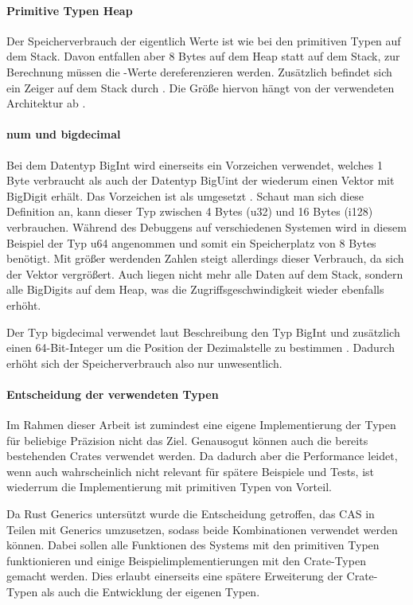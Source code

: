 \documentclass[11pt,a4paper, ngerman]{article}
\begin{document}
\paragraph{Primitive Typen Heap} Der Speicherverbrauch der eigentlich Werte ist wie bei den primitiven Typen auf dem Stack. Davon entfallen aber 8 Bytes auf dem Heap statt auf dem Stack, zur Berechnung müssen die -Werte dereferenzieren werden. Zusätzlich befindet sich ein Zeiger auf dem Stack durch . Die Größe hiervon hängt von der verwendeten Architektur ab \cite{BoxExmaple}.

\paragraph{num und bigdecimal} Bei dem Datentyp BigInt wird einerseits ein Vorzeichen verwendet, welches 1 Byte verbraucht \cite{EnumSize} als auch der Datentyp BigUint der wiederum einen Vektor mit BigDigit erhält. Das Vorzeichen ist als  umgesetzt \cite{BigIntSign}. Schaut man sich diese Definition an, kann dieser Typ zwischen 4 Bytes (u32) und 16 Bytes (i128) verbrauchen. Während des Debuggens auf verschiedenen Systemen wird in diesem Beispiel der Typ u64 angenommen und somit ein Speicherplatz von 8 Bytes benötigt. Mit größer werdenden Zahlen steigt allerdings dieser Verbrauch, da sich der Vektor vergrößert. Auch liegen nicht mehr alle Daten auf dem Stack, sondern alle BigDigits auf dem Heap, was die Zugriffsgeschwindigkeit wieder ebenfalls erhöht.

Der Typ bigdecimal verwendet laut Beschreibung den Typ BigInt und zusätzlich einen 64-Bit-Integer um die Position der Dezimalstelle zu bestimmen \cite{CrateBigdecimalDocs}. Dadurch erhöht sich der Speicherverbrauch also nur unwesentlich.

\paragraph{Entscheidung der verwendeten Typen} Im Rahmen dieser Arbeit ist zumindest eine eigene Implementierung der Typen für beliebige Präzision nicht das Ziel. Genausogut können auch die bereits bestehenden Crates verwendet werden. Da dadurch aber die Performance leidet, wenn auch wahrscheinlich nicht relevant für spätere Beispiele und Tests, ist wiederrum die Implementierung mit primitiven Typen von Vorteil.

Da Rust Generics untersützt wurde die Entscheidung getroffen, das CAS in Teilen mit Generics umzusetzen, sodass beide Kombinationen verwendet werden können. Dabei sollen alle Funktionen des Systems mit den primitiven Typen funktionieren und einige Beispielimplementierungen mit den Crate-Typen gemacht werden. Dies erlaubt einerseits eine spätere Erweiterung der Crate-Typen als auch die Entwicklung der eigenen Typen.
\end{document}
